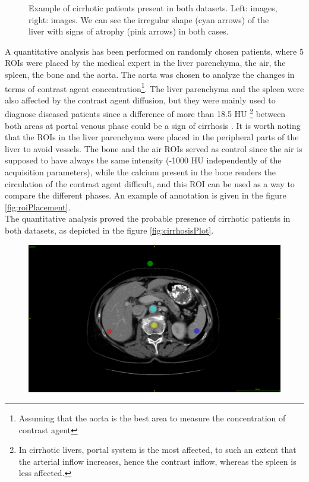 {\begin{figure}[!ht]
\begin{mdframed}[backgroundcolor=blue!50,linecolor=blue!50]
\begin{minipage}{0.45\linewidth}
		\end{minipage}
	\end{mdframed}
	\caption{Example of cirrhotic patients present in both datasets.  Left: \textbf{} images, right: \textbf{} images. We can see the irregular shape (cyan arrows) of the liver with signs of atrophy (pink arrows) in both cases.}
	\label{fig:InterDb_diseasedLivers}
\end{figure}
A quantitative analysis has been performed on randomly chosen patients, where 5 ROIs were placed by the medical expert in the liver parenchyma, the air, the spleen, the bone and the aorta. The aorta was chosen to analyze the changes in terms of contrast agent concentration\footnote{Assuming that the aorta is the best area to measure the concentration of contrast agent}. The liver parenchyma and the spleen were also affected by the contrast agent diffusion, but they were mainly used to diagnose diseased patients since a difference of more than 18.5 HU \footnote{In cirrhotic livers, portal system is the most affected, to such an extent that the arterial inflow increases, hence the contrast inflow, whereas the spleen is less affected.} between both areas at portal venous phase could be a sign of cirrhosis \cite{Wells2016}. It is worth noting that the ROIs in the liver parenchyma were placed in the peripheral parts of the liver to avoid vessels. The bone and the air ROIs served as control since the air is supposed to have always the same intensity (-1000 HU independently of the acquisition parameters), while the calcium present in the bone renders the circulation of the contrast agent difficult, and this ROI can be used as a way to compare the different phases. An example of annotation is given in the figure \ref{fig:roiPlacement}. \\
The quantitative analysis proved the probable presence of cirrhotic patients in both datasets, as depicted in the figure \ref{fig:cirrhosisPlot}.
\begin{figure}[!ht]
	\begin{mdframed}[backgroundcolor=blue!50,linecolor=blue!50]
		\centering
		\includegraphics[width=0.6\linewidth]{images/juan_Roi_Example}

\end{mdframed}
\end{figure}}
